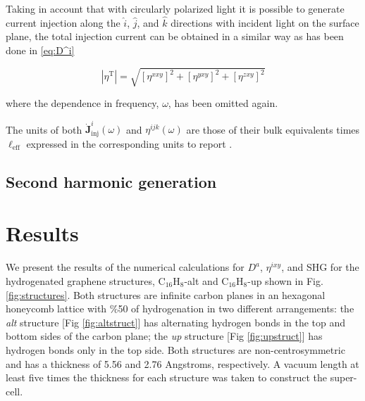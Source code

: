 \documentclass[twocolumn,aps,pra,11pt,tightenlines,showpacs,superscriptaddress,groupedaddress]{revtex4-1}
\newcommand{\da}{$D^{a}$}
\newcommand{\ea}{$\eta^{ixy}$}
\newcommand{\altstc}{C$_{16}$H$_{8}$-alt}
\newcommand{\upstc}{C$_{16}$H$_{8}$-up}
\begin{document}
Taking in account that with circularly polarized light it is possible to generate current injection along the $\hat{i}$, $\hat{j}$, and $\hat{k}$ directions with incident light on the surface plane, the total injection current can be obtained in a similar way as has been done in \ref{eq:D^i}

\begin{equation*}
    |{\eta^{\text{T}}}| = \sqrt{ \left[ \eta^{xxy} \right]^{2} + \left[ \eta^{yxy} \right]^{2} + \left[ \eta^{zxy} \right]^{2} }
\end{equation*}

\noindent where the dependence in frequency, $\omega$, has been omitted again.

The units of both $\mathbf{\dot{J}}^{i}_{\text{inj}}(\omega)$ and $\eta^{ijk} (\omega)$  are those of their bulk equivalents times $\ell_{\text{eff}}$ expressed in the corresponding units to report \cite{cabellos2011optical}.



    \subsection{Second harmonic generation}







\section{Results} %
\label{sec:results}


We present the results of the numerical calculations for \da, \ea, and SHG for the hydrogenated graphene structures, {\altstc} and {\upstc} shown in Fig. \ref{fig:structures}. Both structures are infinite carbon planes in an hexagonal honeycomb lattice with \%50 of hydrogenation in two different arrangements: the \emph{alt} structure [Fig \ref{fig:altstruct}] has alternating hydrogen bonds in the top and bottom sides of the carbon plane; the \emph{up} structure [Fig \ref{fig:upstruct}] has hydrogen bonds only in the top side. Both structures are non-centrosymmetric and has a thickness of 5.56 and 2.76 Angstroms, respectively. A vacuum length at least  five times the thickness for each structure was taken to construct the super-cell.  
\end{document}
